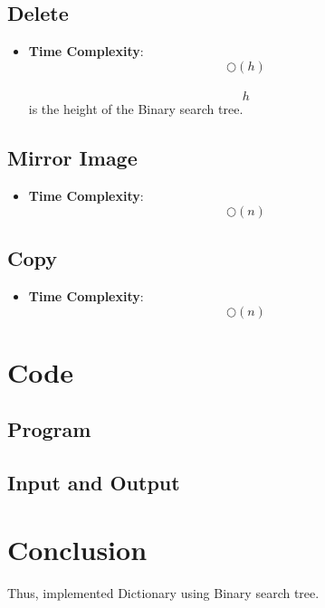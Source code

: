 \documentclass[11pt]{article}
\begin{document}
\subsection{Delete}
\begin{itemize}
    \item \textbf{Time Complexity}: \[\bigcirc(h)\]\\
          \[h\] is the height of the Binary search tree.
\end{itemize}
\subsection{Mirror Image}
\begin{itemize}
    \item \textbf{Time Complexity}:\[\bigcirc(n)\]
\end{itemize}
\subsection{Copy}
\begin{itemize}
    \item \textbf{Time Complexity}:\[\bigcirc(n)\]
\end{itemize}

\section{Code}

\subsection{Program}


\subsection{Input and Output}


\section{Conclusion}
Thus, implemented Dictionary using Binary search tree.
\clearpage
\end{document}
